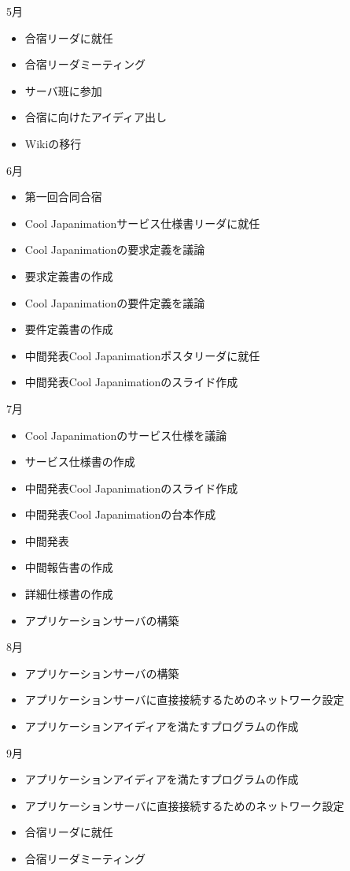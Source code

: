 5月
\begin{itemize}
\item 合宿リーダに就任
\item 合宿リーダミーティング
\item サーバ班に参加
\item 合宿に向けたアイディア出し
\item Wikiの移行
\end{itemize}
6月
\begin{itemize}
\item 第一回合同合宿
\item Cool Japanimationサービス仕様書リーダに就任
\item Cool Japanimationの要求定義を議論
\item 要求定義書の作成
\item Cool Japanimationの要件定義を議論
\item 要件定義書の作成
\item 中間発表Cool Japanimationポスタリーダに就任
\item 中間発表Cool Japanimationのスライド作成
\end{itemize}
7月
\begin{itemize}
\item Cool Japanimationのサービス仕様を議論
\item サービス仕様書の作成
\item 中間発表Cool Japanimationのスライド作成
\item 中間発表Cool Japanimationの台本作成
\item 中間発表
\item 中間報告書の作成
\item 詳細仕様書の作成
\item アプリケーションサーバの構築
\end{itemize}
8月
\begin{itemize}
\item アプリケーションサーバの構築 
\item アプリケーションサーバに直接接続するためのネットワーク設定
\item アプリケーションアイディアを満たすプログラムの作成
\end{itemize}
9月
\begin{itemize}
\item アプリケーションアイディアを満たすプログラムの作成
\item アプリケーションサーバに直接接続するためのネットワーク設定
\item 合宿リーダに就任
\item 合宿リーダミーティング
\end{itemize}
